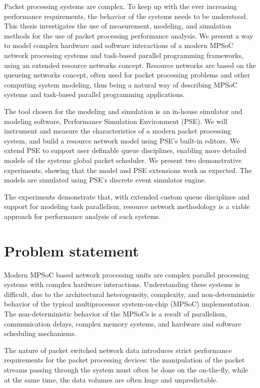 Packet processing systems are complex. To keep up with the ever increasing performance requirements, the behavior of the systems needs to be understood. This thesis investigates the use of measurement, modeling, and simulation methods for the use of packet processing performance analysis. We present a way to model complex hardware and software interactions of a modern MPSoC network processing systems and task-based parallel programming frameworks, using an extended resource networks concept. Resource networks are based on the queueing networks concept, often used for packet processing problems and other computing system modeling, thus being a natural way of describing MPSoC systems and task-based parallel programming applications.

The tool chosen for the modeling and simulation is an in-house simulator and modeling software, Performance Simulation Environment (PSE). We will instrument and measure the characteristics of a modern packet processing system, and build a resource network model using PSE's built-in editors. We extend PSE to support user definable queue disciplines, enabling more detailed models of the systems global packet scheduler. We present two demonstrative experiments, showing that the model and PSE extensions work as expected. The models are simulated using PSE's discrete event simulator engine.

The experiments demonstrate that, with extended custom queue disciplines and support for modeling task parallelism, resource network methodology is a viable approach for performance analysis of such systems.

\section{Problem statement}
Modern MPSoC based network processing units are complex parallel processing systems with complex hardware interactions. Understanding these systems is difficult, due to the architectural heterogeneity, complexity, and non-deterministic behavior of the typical multiprocessor system-on-chip (MPSoC) implementation. The non-deterministic behavior of the MPSoCs is a result of parallelism, communication delays, complex memory systems, and hardware and software scheduling mechanisms.


The nature of packet switched network data introduces strict performance requirements for the packet processing devices: the manipulation of the packet streams passing through the system must often be done on the on-the-fly, while at the same time, the data volumes are often huge and unpredictable.

